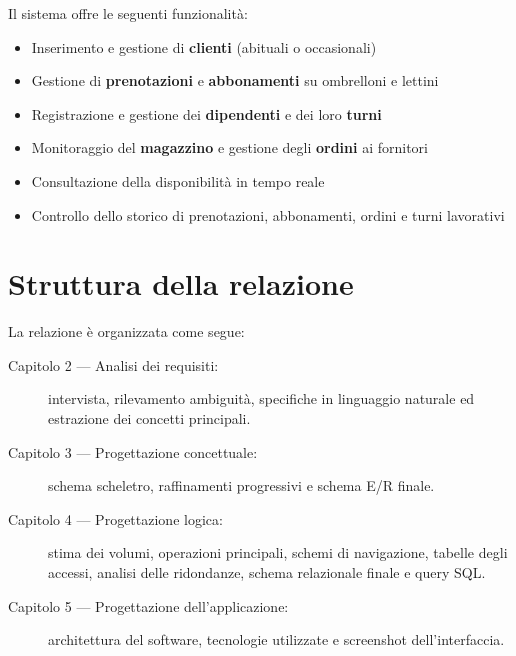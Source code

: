 Il sistema offre le seguenti funzionalità:

\begin{itemize}
  \item Inserimento e gestione di \textbf{clienti} (abituali o occasionali)
  \item Gestione di \textbf{prenotazioni} e \textbf{abbonamenti} su ombrelloni e lettini
  \item Registrazione e gestione dei \textbf{dipendenti} e dei loro \textbf{turni}
  \item Monitoraggio del \textbf{magazzino} e gestione degli \textbf{ordini} ai fornitori
  \item Consultazione della disponibilità in tempo reale
  \item Controllo dello storico di prenotazioni, abbonamenti, ordini e turni lavorativi
\end{itemize}

\section{Struttura della relazione}

La relazione è organizzata come segue:

\begin{description}
  \item[Capitolo 2 --- Analisi dei requisiti:] intervista, rilevamento ambiguità,
    specifiche in linguaggio naturale ed estrazione dei concetti principali.
  \item[Capitolo 3 --- Progettazione concettuale:] schema scheletro, raffinamenti
    progressivi e schema E/R finale.
  \item[Capitolo 4 --- Progettazione logica:] stima dei volumi, operazioni principali,
    schemi di navigazione, tabelle degli accessi, analisi delle ridondanze, schema
    relazionale finale e query SQL.
  \item[Capitolo 5 --- Progettazione dell'applicazione:] architettura del software,
    tecnologie utilizzate e screenshot dell'interfaccia.
\end{description}
